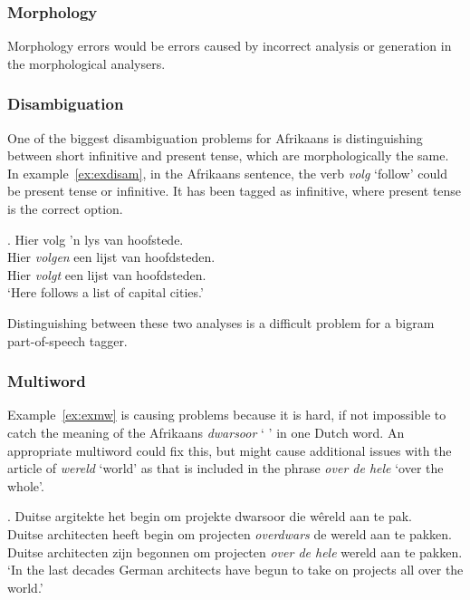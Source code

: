 \documentclass[11pt]{article}
\begin{document}
\subsubsection{Morphology}

Morphology errors would be errors caused by incorrect analysis or generation in the morphological analysers.

\subsubsection{Disambiguation}

One of the biggest disambiguation problems for Afrikaans is distinguishing between short infinitive and present 
tense, which are morphologically the same. In example~\ref{ex:exdisam}, in the Afrikaans sentence, the verb 
{\em volg} `follow' could be present tense or infinitive. It has been tagged as infinitive, where present tense 
is the correct option.

\ex. \label{ex:exdisam} 
    Hier volg 'n lys van hoofstede. \\
    Hier {\em volgen} een lijst van hoofdsteden. \\
    Hier {\em volgt} een lijst van hoofdsteden.  \\
   `Here follows a list of capital cities.'

Distinguishing between these two analyses is a difficult problem for a bigram part-of-speech tagger.

\subsubsection{Multiword}

Example~\ref{ex:exmw} is causing problems because it is hard, if not impossible to catch the meaning of the 
Afrikaans {\em dwarsoor} ` ' in one Dutch word. An appropriate multiword could fix this, but might 
cause additional issues with the article of {\em wereld} `world' as that is included in the 
phrase {\em over de hele} `over the whole'.

\ex. \label{ex:exmw} 
    Duitse argitekte het begin om projekte dwarsoor die wêreld aan te pak. \\
    Duitse architecten heeft begin om projecten {\em overdwars} de wereld aan te pakken. \\
    Duitse architecten zijn begonnen om projecten {\em over de hele} wereld aan te pakken. \\
   `In the last decades German architects have begun to take on projects all over the world.'
\end{document}
